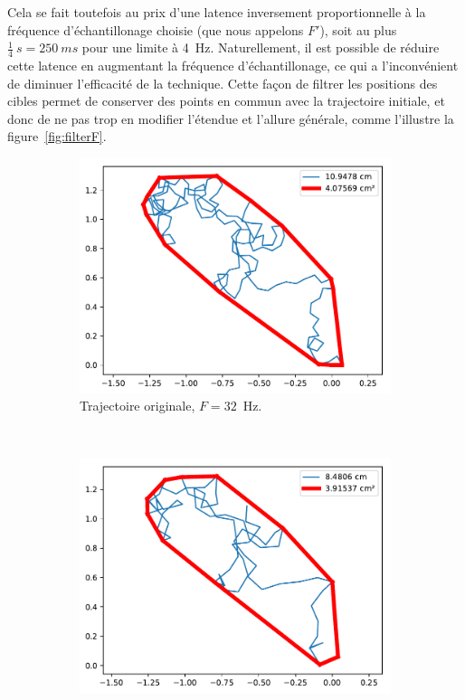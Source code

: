 	Cela se fait toutefois au prix d'une latence inversement proportionnelle à la fréquence d'échantillonage choisie (que nous appelons $F'$), soit au plus $\frac{1}{4}~s = 250~ms$ pour une limite à 4~Hz. Naturellement, il est possible de réduire cette latence en augmentant la fréquence d'échantillonage, ce qui a l'inconvénient de diminuer l'efficacité de la technique. Cette façon de filtrer les positions des cibles permet de conserver des points en commun avec la trajectoire initiale, et donc de ne pas trop en modifier l'étendue et l'allure générale, comme l'illustre la figure~\ref{fig:filterF}.
	
	\begin{figure}[htbp]
		\begin{subfigure}[t]{0.49\textwidth}
			\centering
			\includegraphics[width=\textwidth]{figures/ch5/2_19_freqFilter_2_19_120_32}
			\caption{Trajectoire originale, $F = 32$~Hz.}
			\label{fig:filterFnoFilter}
		\end{subfigure}
		~
		\begin{subfigure}[t]{0.49\textwidth}
			\centering
			\includegraphics[width=\textwidth]{figures/ch5/2_19_freqFilter_2_19_120_32_filter_16}

\end{subfigure}
\end{figure}

